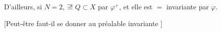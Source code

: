 D'ailleurs, si $N=2$, $\exists!$  $Q\subset X$  par $\varphi^+$, et elle est $=$ invariante par $\varphi$.

[Peut-être faut-il se donner au préalable  invariante ]

